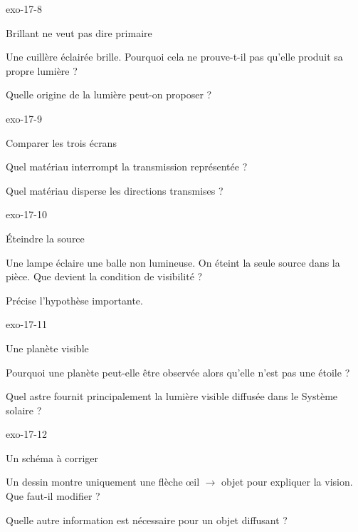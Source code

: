 \documentclass[12pt,twoside,openany]{book}
\begin{document}
\begin{blocLivre}{exo-17-8}
\begin{exercice}[2]{Brillant ne veut pas dire primaire}
\begin{questions}
\item Une cuillère éclairée brille. Pourquoi cela ne prouve-t-il pas qu’elle produit sa propre lumière ?
\item Quelle origine de la lumière peut-on proposer ?
\end{questions}
\end{exercice}\end{blocLivre}
\begin{blocLivre}{exo-17-9}
\begin{exercice}[2]{Comparer les trois écrans}
\begin{questions}
\item Quel matériau interrompt la transmission représentée ?
\item Quel matériau disperse les directions transmises ?
\end{questions}
\end{exercice}\end{blocLivre}
\begin{blocLivre}{exo-17-10}
\begin{exercice}[2]{Éteindre la source}
\begin{questions}
\item Une lampe éclaire une balle non lumineuse. On éteint la seule source dans la pièce. Que devient la condition de visibilité ?
\item Précise l’hypothèse importante.
\end{questions}
\end{exercice}\end{blocLivre}
\begin{blocLivre}{exo-17-11}
\begin{exercice}[2]{Une planète visible}
\begin{questions}
\item Pourquoi une planète peut-elle être observée alors qu’elle n’est pas une étoile ?
\item Quel astre fournit principalement la lumière visible diffusée dans le Système solaire ?
\end{questions}
\end{exercice}\end{blocLivre}
\begin{blocLivre}{exo-17-12}
\begin{exercice}[3]{Un schéma à corriger}
\begin{questions}
\item Un dessin montre uniquement une flèche œil \(\rightarrow\) objet pour expliquer la vision. Que faut-il modifier ?
\item Quelle autre information est nécessaire pour un objet diffusant ?
\end{questions}
\end{exercice}\end{blocLivre}
\end{document}
